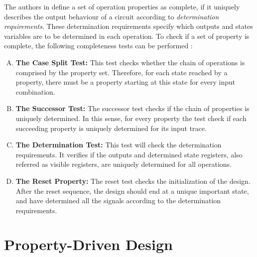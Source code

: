  

The authors in \cite{paper-gapfree} define a set of operation properties as complete, if it uniquely describes the output behaviour of a circuit according to \textit{determination requirements}. These determination requirements specify which outputs and states variables are to be determined in each operation. To check if a set of property is complete, the following completeness tests can be performed \cite{guide-onespin}:

\begin{enumerate}[A.]
    \item \textbf{The Case Split Test:} This test checks whether the chain of operations is comprised by the property set. Therefore, for each state reached by a property, there must be a property starting at this state for every input combination.
    \item \textbf{The Successor Test:} The successor test checks if the chain of properties is uniquely determined. In this sense, for every property the test check if each succeeding property is uniquely determined for its input trace.
    \item \textbf{The Determination Test:} This test will check the determination requirements. It verifies if the outputs and determined state registers, also referred as visible registers, are uniquely determined for all operations.
    \item \textbf{The Reset Property:} The reset test checks the initialization of the design. After the reset sequence, the design should end at a unique important state, and have determined all the signals according to the determination requirements.
\end{enumerate}


\section{Property-Driven Design}
\label{section:PDD}

